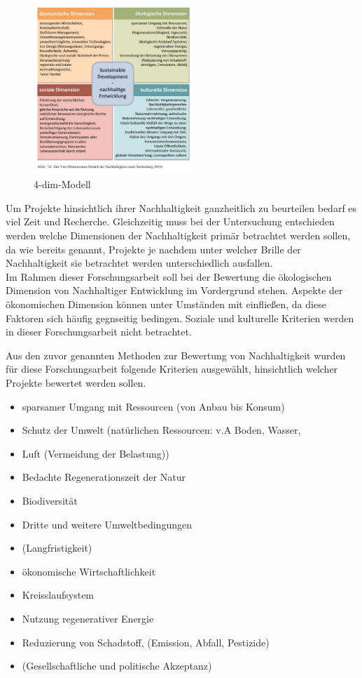 \documentclass{scrartcl}
\begin{document}
\begin{figure}[h]
\centering
\includegraphics[width=6cm]{image_folder/vierdimensionenmodell_der_N.png}
\caption{4-dim-Modell}
\label{fig:4-dimensionen Modell}
\end{figure}

Um Projekte hinsichtlich ihrer Nachhaltigkeit ganzheitlich zu beurteilen bedarf es viel Zeit und Recherche. Gleichzeitig muss bei der Untersuchung entschieden werden welche Dimensionen der Nachhaltigkeit primär betrachtet werden sollen, da wie bereits genannt, Projekte je nachdem unter welcher Brille der Nachhaltigkeit sie betrachtet werden unterschiedlich ausfallen.
\\
Im Rahmen dieser Forschungsarbeit soll bei der Bewertung die ökologischen Dimension von Nachhaltiger Entwicklung im Vordergrund stehen. Aspekte der ökonomischen Dimension können unter Umständen mit einfließen, da diese Faktoren sich häufig gegnseitig bedingen. Soziale und kulturelle Kriterien werden in dieser Forschungsarbeit nicht betrachtet.

Aus den zuvor genannten Methoden zur Bewertung von Nachhaltigkeit wurden für diese Forschungsarbeit folgende Kriterien ausgewählt, hinsichtlich welcher Projekte bewertet werden sollen.

\begin{itemize}
\item sparsamer Umgang mit Ressourcen (von Anbau bis Konsum)
\item Schutz der Umwelt (natürlichen Ressourcen: v.A Boden, Wasser, \item Luft (Vermeidung der Belastung))
\item Bedachte Regenerationszeit der Natur
\item Biodiversität
\item Dritte und weitere Umweltbedingungen
\item (Langfristigkeit)
\item ökonomische Wirtschaftlichkeit
\item Kreisslaufsystem
\item Nutzung regenerativer Energie
\item Reduzierung von Schadstoff, (Emission, Abfall, Pestizide)
\item (Gesellschaftliche und politische Akzeptanz)
\end{itemize}
\end{document}
